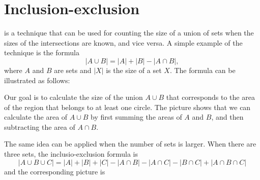 \section{Inclusion-exclusion}


 is a technique
that can be used for counting the size
of a union of sets when the sizes of
the intersections are known, and vice versa.
A simple example of the technique is the formula
\[ |A \cup B| = |A| + |B| - |A \cap B|,\]
where $A$ and $B$ are sets and $|X|$
is the size of a set $X$.
The formula can be illustrated as follows:

\begin{center}
\end{center}

Our goal is to calculate
the size of the union $A \cup B$
that corresponds to the area of the region
that belongs to at least one circle.
The picture shows that we can calculate
the area of $A \cup B$ by first summing the
areas of $A$ and $B$, and then subtracting
the area of $A \cap B$.

The same idea can be applied when the number
of sets is larger.
When there are three sets, the inclusio-exclusion formula is
\[ |A \cup B \cup C| = |A| + |B| + |C| - |A \cap B|  - |A \cap C|  - |B \cap C| + |A \cap B \cap C| \]
and the corresponding picture is

\begin{center}
\end{center}

